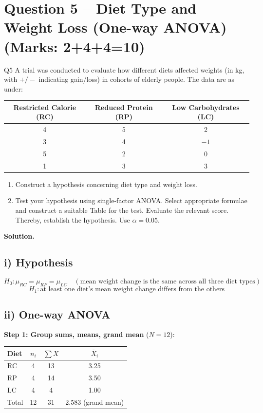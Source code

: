 \documentclass[11pt]{article}
\newcommand{\soln}{\par\noindent\textcolor{acolor}{\textbf{Solution.}}\quad}
\begin{document}
\section{Question 5 -- Diet Type and Weight Loss (One-way ANOVA) (Marks: 2+4+4=10)}
\begin{question}{Q5}
A trial was conducted to evaluate how different diets affected weights (in kg, with $+/-$ indicating gain/loss) in cohorts of elderly people. The data are as under:

\begin{center}
\begin{tabular}{ccc}
\toprule
Restricted Calorie (RC) & Reduced Protein (RP) & Low Carbohydrates (LC) \\
\midrule
4  & 5 & 2  \\
3  & 4 & $-1$ \\
5  & 2 & 0  \\
1  & 3 & 3  \\
\bottomrule
\end{tabular}
\end{center}

\begin{enumerate}[label=\roman*)]
\item Construct a hypothesis concerning diet type and weight loss.
\item Test your hypothesis using single-factor ANOVA. Select appropriate formulae and construct a suitable Table for the test. Evaluate the relevant score. Thereby, establish the hypothesis. Use $\alpha=0.05$.
\end{enumerate}
\end{question}

\soln

\subsection*{i) Hypothesis}
\[
H_0: \mu_{RC} = \mu_{RP} = \mu_{LC} \quad (\text{mean weight change is the same across all three diet types})
\]
\[
H_1: \text{at least one diet's mean weight change differs from the others}
\]

\subsection*{ii) One-way ANOVA}

\textbf{Step 1: Group sums, means, grand mean} ($N=12$):
\begin{center}
\begin{tabular}{lccc}
\toprule
Diet & $n_i$ & $\sum X$ & $\bar{X}_i$ \\
\midrule
RC & 4 & 13 & 3.25 \\
RP & 4 & 14 & 3.50 \\
LC & 4 & 4  & 1.00 \\
\midrule
Total & 12 & 31 & 2.583 (grand mean) \\
\bottomrule
\end{tabular}
\end{center}
\end{document}
